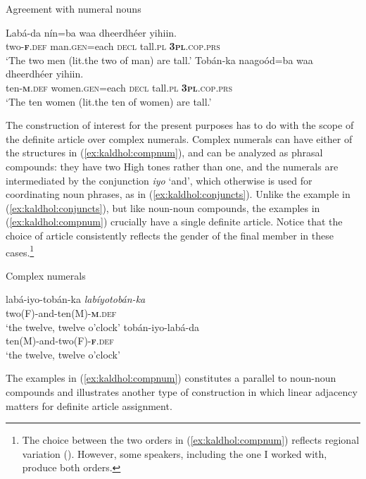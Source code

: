 \documentclass[output=paper]{langscibook}
\begin{document}
\ea\label{ex:kaldhol:numerals}
	Agreement with numeral nouns
	\begin{xlist}
		\ex
		\gll Labá-da nín=ba waa dheerdhéer yihiin.\\
		two-\textsc{\textbf{f}.def} man.\textsc{gen}=each \textsc{decl} tall.\textsc{pl} \textsc{\textbf{3pl}.cop.prs}\\
		\glt `The two men (lit.\@ the two of man) are tall.'
		\ex 
		\gll Tobán-ka naagoód=ba waa dheerdhéer yihiin.\\
		ten-\textsc{\textbf{m}.def} women.\textsc{gen}=each \textsc{decl} tall.\textsc{pl} \textsc{\textbf{3pl}.cop.prs}\\
		\glt `The ten women (lit.\@ the ten of women) are tall.'
	\end{xlist}
\z
The construction of interest for the present purposes has to do with the scope of the definite article over complex numerals. Complex numerals can have either of the structures in (\ref{ex:kaldhol:compnum}), and can be analyzed as phrasal compounds: they have two High tones rather than one, and the numerals are intermediated by the conjunction \textit{iyo} `and', which otherwise is used for coordinating noun phrases, as in (\ref{ex:kaldhol:conjuncts}). Unlike the example in (\ref{ex:kaldhol:conjuncts}), but like noun-noun compounds, the examples in (\ref{ex:kaldhol:compnum}) crucially have a single definite article. Notice that the choice of article consistently reflects the gender of the final member in these cases.\footnote{The choice between the two orders in (\ref{ex:kaldhol:compnum}) reflects regional variation (\citealt{Nilsson2018}). However, some speakers, including the one I worked with, produce both orders.}

\ea\label{ex:kaldhol:compnum}
	Complex numerals
	\begin{xlist}
		\ex
		\gll labá-iyo-tobán-{ka \pil \textit{labíyotobán-ka}}\\
		two(F)-and-ten(M)-\textsc{\textbf{m}.def}\\
		\glt `the twelve, twelve o'clock'
		\ex
		\gll tobán-iyo-labá-da\\
		ten(M)-and-two(F)-\textsc{\textbf{f}.def}\\
		\glt `the twelve, twelve o'clock'
	\end{xlist}
\z
The examples in (\ref{ex:kaldhol:compnum}) constitutes a parallel to noun-noun compounds and illustrates another type of construction in which linear adjacency matters for definite article assignment.
\end{document}
